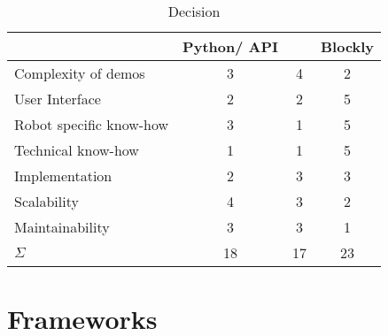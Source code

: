 \begin{table}[htbp]
	\centering
	\begin{tabular}{l c c c}
		\toprule
		                        & Python/\Cpp{} API & \smach{} & Blockly \\
		\midrule
		Complexity of demos     & 3                 & 4        & 2       \\
		User Interface          & 2                 & 2        & 5       \\
		Robot specific know-how & 3                 & 1        & 5       \\
		Technical know-how      & 1                 & 1        & 5       \\
		Implementation          & 2                 & 3        & 3       \\
		Scalability             & 4                 & 3        & 2       \\
		Maintainability         & 3                 & 3        & 1       \\
		\bottomrule
		$\Sigma$                & 18                & 17       & 23      \\
		\bottomrule
	\end{tabular}
	\caption{Decision}
	\label{tab:decision}
\end{table}

\section{Frameworks}
